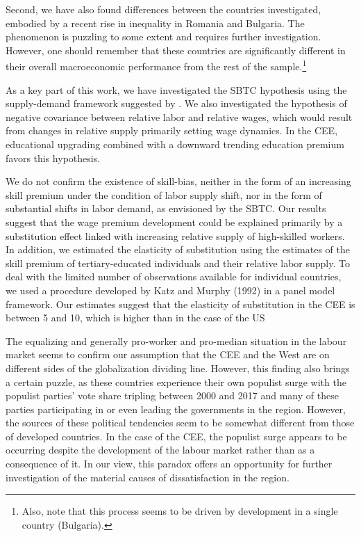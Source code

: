 \documentclass[11pt]{article}
\begin{document}
Second, we have also found differences between the countries investigated, embodied by a recent rise in inequality in Romania and Bulgaria. The phenomenon is puzzling to some extent and requires further investigation. However, one should remember that these countries are significantly different in their overall macroeconomic performance from the rest of the sample.\footnote{
Also, note that this process seems to be driven by development in a single country (Bulgaria).}

As a key part of this work, we have investigated the SBTC hypothesis using the supply-demand framework suggested by \citeauthor{katz1992changes}. We also investigated the hypothesis of negative covariance between relative labor and relative wages, which would result from changes in relative supply primarily setting wage dynamics. In the CEE, educational upgrading combined with a downward trending education premium favors this hypothesis.

We do not confirm the existence of skill-bias, neither in the form of an increasing skill premium under the condition of labor supply shift, nor in the form of substantial shifts in labor demand, as envisioned by the SBTC. Our results suggest that the wage premium development could be explained primarily by a substitution effect linked with increasing relative supply of high-skilled workers. In addition, we estimated the elasticity of substitution using the estimates of the skill premium of tertiary-educated individuals and their relative labor supply. To deal with the limited number of observations available for individual countries, we used a procedure developed by Katz and Murphy (1992) in a panel model framework. Our estimates suggest that the elasticity of substitution in the CEE is between 5 and 10, which is higher than in the case of the US


The equalizing and generally pro-worker and pro-median situation in the labour market seems to confirm our assumption that the CEE and the West are on different sides of the globalization dividing line. However, this finding also brings a certain puzzle, as these countries experience their own populist surge with the populist parties' vote share tripling between 2000 and 2017 and many of these parties participating in or even leading the governments in the region. However, the sources of these political tendencies seem to be somewhat different from those of developed countries. In the case of the CEE, the populist surge appears to be occurring despite the development of the labour market rather than as a consequence of it. In our view, this paradox offers an opportunity for further investigation of the material causes of dissatisfaction in the region.
\end{document}
